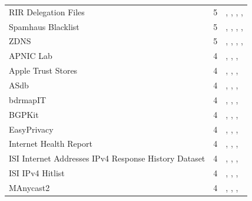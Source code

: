 \documentclass[11pt,a4paper]{article}
\begin{document}
\begin{longtable}{@{}p{} p{}p{}@{}}
RIR Delegation Files  & 5 & \cite{10.1145/3730567.3764449}, \cite{10.1145/3487552.3487825}, \cite{10.1007/978-3-030-98785-5_29}, \cite{10.1145/3777912.3839831}, \cite{10.1145/3777912.3809155} \\
Spamhaus Blacklist  & 5 & \cite{10.1145/3646547.3689010}, \cite{10.1145/3517745.3561454}, \cite{10.1145/3487552.3487838}, \cite{10.1007/978-3-030-98785-5_2}, \cite{10.1007/978-3-031-56249-5_9} \\
ZDNS  & 5 & \cite{10.1145/3646547.3688449}, \cite{10.1007/978-3-031-56249-5_5}, \cite{10.1007/978-3-031-85960-1_3}, \cite{10.1145/3777912.3839830}, \cite{10.1145/3777912.3839828} \\
APNIC Lab & 4 & \cite{10.1145/3646547.3688411}, \cite{10.1145/3777912.3809137}, \cite{10.1145/3777912.3839801}, \cite{10.1145/3777912.3809144} \\
Apple Trust Stores  & 4 & \cite{10.1145/3618257.3624815}, \cite{10.1145/3646547.3688415}, \cite{10.1007/978-3-030-72582-2_11}, \cite{10.1007/978-3-031-28486-1_4} \\
ASdb  & 4 & \cite{10.1145/3730567.3764481}, \cite{10.1145/3730567.3732917}, \cite{10.1145/3618257.3624811}, \cite{10.1145/3777912.3809155} \\
bdrmapIT  & 4 & \cite{10.1007/978-3-030-72582-2_14}, \cite{10.1007/978-3-030-98785-5_20}, \cite{10.1007/978-3-030-98785-5_29}, \cite{10.1145/3777912.3809135} \\
BGPKit  & 4 & \cite{10.1145/3646547.3688444}, \cite{10.1007/978-3-031-85960-1_13}, \cite{10.1145/3777912.3809143}, \cite{10.1145/3777912.3839812} \\
EasyPrivacy  & 4 & \cite{10.1145/3730567.3764427}, \cite{10.1145/3618257.3624823}, \cite{10.1145/3487552.3487855}, \cite{10.1145/3777912.3839794} \\
Internet Health Report  & 4 & \cite{10.1145/3517745.3561419}, \cite{10.1007/978-3-031-56252-5_10}, \cite{10.1145/3777912.3809137}, \cite{10.1145/3777912.3839831} \\
ISI Internet Addresses IPv4 Response History Dataset  & 4 & \cite{10.1145/3730567.3764781}, \cite{10.1145/3618257.3624831}, \cite{10.1007/978-3-031-56249-5_8}, \cite{10.1145/3777912.3839790} \\
ISI IPv4 Hitlist  & 4 & \cite{10.1145/3730567.3764484}, \cite{10.1145/3517745.3561421}, \cite{10.1007/978-3-031-85960-1_16}, \cite{10.1145/3777912.3809139} \\
MAnycast2  & 4 & \cite{10.1145/3517745.3561458}, \cite{10.1007/978-3-031-56252-5_1}, \cite{10.1007/978-3-031-56252-5_6}, \cite{10.1007/978-3-031-85960-1_16} \\

\end{longtable}
\end{document}
